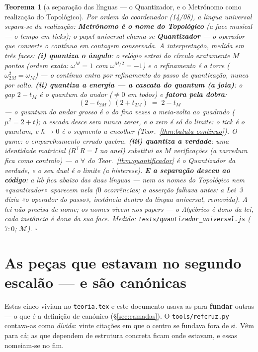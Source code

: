 \documentclass[11pt,a4paper]{article}
\newtheorem{teorema}{Teorema}
\newcommand{\code}[1]{\texttt{\small #1}}
\begin{document}
\begin{teorema}[a separação das línguas --- o Quantizador, e o
Metrónomo como realização do Topológico]\label{thm:quantizador-universal}
Por ordem do coordenador (14/08), a língua universal separa-se da
realização: \textbf{Metrónomo é o nome do Topológico} (a face musical ---
o tempo em ticks); o papel universal chama-se \textbf{Quantizador}
--- \emph{o operador que converte o contínuo em contagem conservada}.
A interpretação, medida em três faces:
\textbf{(i) quantiza o ângulo}: o relógio extrai do círculo
exatamente $M$ pontos (ordem \emph{exata}: $\omega^{M}=1$ com
$\omega^{M/2}=-1$) e o refinamento é a torre
($\omega_{2M}^{2}=\omega_{M}$) --- o contínuo entra por refinamento
do passo de quantização, nunca por salto.
\textbf{(ii) quantiza a energia --- a cascata do quantum (a joia)}:
o gap $2-t_{M}$ é o \emph{quantum do andar} ($\neq0$ em todos) e
\textbf{fatora pela dobra}:
\[
\boxed{\;(2-t_{2M})\,(2+t_{2M})\;=\;2-t_{M}\;}
\]
--- o quantum do andar grosso é o do fino vezes a meia-volta ao
quadrado ($\mu^{2}=2+t$); a escada desce sem nunca zerar, e o zero é
só do limite: \emph{o tick é o quantum, e $\hbar\to0$ é o segmento a
encolher} (Teor.~\ref{thm:batuta-continuo}). O gume: o
emparelhamento errado quebra.
\textbf{(iii) quantiza a verdade}: \emph{uma} identidade matricial
($R^{\mathsf{T}}R=I$ no anel) substitui as $M$ verificações (a
varredura fica como controlo) --- o $\forall$ do
Teor.~\ref{thm:quantificador} é o Quantizador da verdade, e o seu
dual é o limite (a histerese).
\textbf{E a separação desceu ao código}: a lib fica \emph{abaixo}
das duas línguas --- nem os nomes do Topológico nem «quantizador»
aparecem nela ($0$ ocorrências; a asserção \emph{falhava} antes: a
Lei~3 dizia «o operador do passo», instância dentro da língua universal,
removida). A lei não precisa de nome; os nomes vivem nos papers ---
o Algébrico é dono da lei, cada instância é dona da sua face.
\emph{Medido:} \code{tests/quantizador\_universal.js} ($7{:}0$;
$\mathcal{M}$).
$\square$
\end{teorema}

\section{As peças que estavam no segundo escalão --- e são canónicas}\label{sec:trazidas}

Estas cinco viviam no \code{teoria.tex} e este documento usava-as para \textbf{fundar}
outras --- o que é a definição de canónico (\S\ref{sec:camadas}). O
\code{tools/refcruz.py} contava-as como \emph{dívida}: vinte citações em que o centro se
fundava fora de si. Vêm para cá; as que dependem de estrutura concreta ficam onde estavam,
e essas nomeiam-se no fim.
\end{document}
